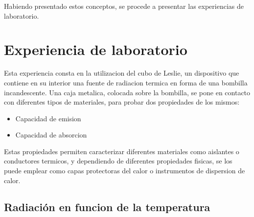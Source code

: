 \documentclass[a4paper,12pt]{report}
\begin{document}
  Habiendo presentado estos conceptos, se procede a presentar las experiencias de laboratorio.

\chapter{Experiencia de laboratorio}
  Esta experiencia consta en la utilizacion del cubo de Leslie, un dispositivo que contiene en su interior una fuente
  de radiacion termica en forma de una bombilla incandescente. Una caja metalica, colocada sobre la bombilla, se pone
  en contacto con diferentes tipos de materiales, para probar dos propiedades de los mismos:
  \begin{itemize}
    \item Capacidad de emision
    \item Capacidad de absorcion
  \end{itemize}

  Estas propiedades permiten caracterizar diferentes materiales como aislantes o conductores termicos, y dependiendo de
  diferentes propiedades fisicas, se los puede emplear como capas protectoras del calor o instrumentos de dispersion de
  calor.

  \section{Radiación en funcion de la temperatura}
\end{document}

